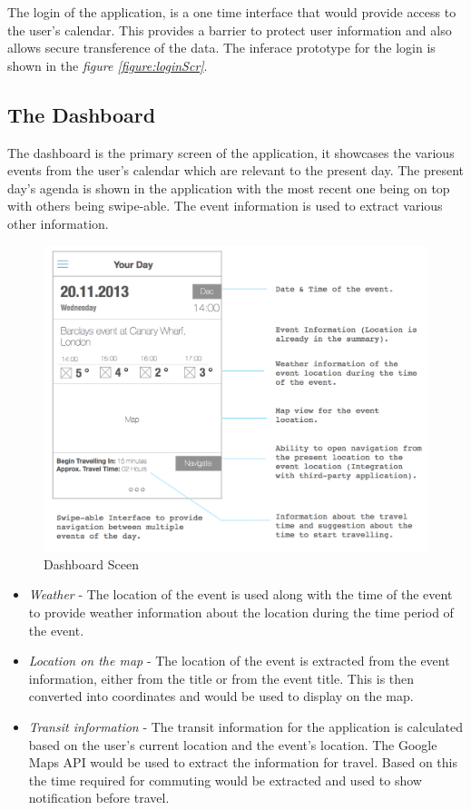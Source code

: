 \documentclass[12pt]{report}
\begin{document}
The login of the application, is a one time interface that would provide access to the user's calendar. This provides a barrier to protect user information and also allows secure transference of the data. The inferace prototype for the login is shown in the \textit{figure \ref{figure:loginScr}}.

\subsection{The Dashboard}
The dashboard is the primary screen of the application, it showcases the various events from the user's calendar which are relevant to the present day. The present day's agenda is shown in the application with the most recent one being on top with others being swipe-able. The event information is used to extract various other information.

\begin{figure}[htbp]
 \centering
 \includegraphics[width=130mm]{DashboardScr.png}
   \caption[Dashboard Sceen]{Dashboard Sceen}
 \label{figure:DashboardScr}
\end{figure}

\begin{itemize}
\item \textit{Weather} - The location of the event is used along with the time of the event to provide weather information about the location during the time period of the event.

\item \textit{Location on the map} - The location of the event is extracted from the event information, either from the title or from the event title. This is then converted into coordinates and would be used to display on the map.

\item \textit{Transit information} - The transit information for the application is calculated based on the user's current location and the event's location. The Google Maps API would be used to extract the information for travel. Based on this the time required for commuting would be extracted and used to show notification before travel.
\end{itemize}
\end{document}
